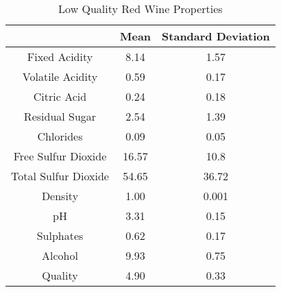 \begin{table}[ht]
\caption{Low Quality Red Wine Properties}
\begin{center}
\begin{tabular}{ccc}
  \hline
 &Mean &Standard Deviation\\ 
  \hline
  Fixed Acidity & 8.14 & 1.57 \\ 
  Volatile Acidity & 0.59 & 0.17 \\ 
  Citric Acid & 0.24 & 0.18\\ 
  Residual Sugar & 2.54 & 1.39\\ 
  Chlorides & 0.09 & 0.05\\ 
  Free Sulfur Dioxide & 16.57 & 10.8\\ 
  Total Sulfur Dioxide & 54.65 & 36.72\\ 
  Density & 1.00 & 0.001\\ 
  pH & 3.31 & 0.15\\ 
  Sulphates & 0.62 & 0.17\\ 
  Alcohol & 9.93 & 0.75\\ 
  Quality & 4.90 & 0.33\\ 
   \hline
\end{tabular}
\end{center}
\end{table}   
